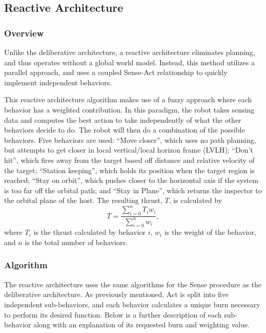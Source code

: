 \documentclass[journal, 10pt]{IEEEtran}
\begin{document}
\subsection{Reactive Architecture}
\subsubsection{Overview}
Unlike the deliberative architecture, a reactive architecture eliminates planning, and thus operates without a global world model. Instead, this method utilizes a parallel approach, and uses a coupled Sense-Act relationship to quickly implement independent behaviors\cite{joshi}.

This reactive architecture algorithm makes use of a fuzzy approach where each behavior has a weighted contribution. In this paradigm, the robot takes sensing data and computes the best action to take independently of what the other behaviors decide to do. The robot will then do a combination of the possible behaviors. Five behaviors are used: ``Move closer'', which uses no path planning, but attempts to get closer in local vertical/local horizon frame (LVLH); ``Don't hit'', which fires away from the target based off distance and relative velocity of the target; ``Station keeping'', which holds its position when the target region is reached; ``Stay on orbit'', which pushes closer to the horizontal axis if the system is too far off the orbital path; and ``Stay in Plane'', which returns the inspector to the orbital plane of the host. The resulting thrust, $T$, is calculated by
\begin{equation}
T = \frac{ \sum^{n}_{i=0} T_i w_i} { \sum^{n}_{i=0} w_i },
\end{equation}
where $T_i$ is the thrust calculated by behavior $i$, $w_i$ is the weight of the behavior, and $n$ is the total number of behaviors.

\subsubsection{Algorithm}
The reactive architecture uses the same algorithms for the Sense procedure as the deliberative architecture.  As previously mentioned, Act is split into five independent sub-behaviors, and each behavior calculates a unique burn necessary to perform its desired function.  Below is a further description of each sub-behavior along with an explanation of its requested burn and weighting value.
\end{document}
